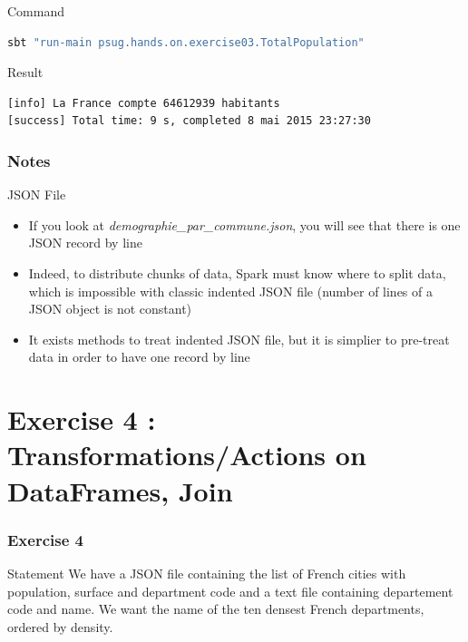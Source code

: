 \documentclass[slidetop,9pt,utf8]{beamer}
\begin{document}
\begin{CJK}{UTF8}{gbsn}
\begin{frame}[fragile]
  \begin{block}{Command}
    \begin{lstlisting}[language=bash, style=terminal-medium]
sbt "run-main psug.hands.on.exercise03.TotalPopulation"
    \end{lstlisting}
  \end{block}

  \begin{block}{Result}
    \begin{lstlisting}[language=bash, style=terminal]
[info] La France compte 64612939 habitants
[success] Total time: 9 s, completed 8 mai 2015 23:27:30
    \end{lstlisting}
  \end{block}

\end{frame}

\begin{frame}
  \frametitle{Notes}

  \begin{exampleblock}{JSON File}
    \begin{itemize}
      \item If you look at \textit{demographie\_par\_commune.json}, you will see that there is one JSON record by line
      \item Indeed, to distribute chunks of data, Spark must know where to split data, which is impossible with classic indented JSON file (number of lines of a JSON object is not constant)
      \item It exists methods to treat indented JSON file, but it is simplier to pre-treat data in order to have one record by line
    \end{itemize}
  \end{exampleblock}

\end{frame}

\section{Exercise 4 : Transformations/Actions on DataFrames, Join}

\begin{frame}
  \frametitle{Exercise 4}

  \begin{block}{Statement}
    We have a JSON file containing the list of French cities with population, surface and department code and a text file containing departement code and name. We want the name of the ten densest French departments, ordered by density.
  \end{block}


\end{frame}
\end{CJK}
\end{document}
